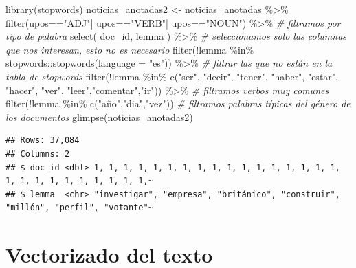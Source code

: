\documentclass[
]{book}
\newenvironment{Shaded}{\begin{snugshade}}{\end{snugshade}}
\newcommand{\AttributeTok}[1]{\textcolor[rgb]{0.77,0.63,0.00}{#1}}
\newcommand{\CommentTok}[1]{\textcolor[rgb]{0.56,0.35,0.01}{\textit{#1}}}
\newcommand{\FunctionTok}[1]{\textcolor[rgb]{0.00,0.00,0.00}{#1}}
\newcommand{\NormalTok}[1]{#1}
\newcommand{\OtherTok}[1]{\textcolor[rgb]{0.56,0.35,0.01}{#1}}
\newcommand{\SpecialCharTok}[1]{\textcolor[rgb]{0.00,0.00,0.00}{#1}}
\newcommand{\StringTok}[1]{\textcolor[rgb]{0.31,0.60,0.02}{#1}}
\begin{document}
\begin{Shaded}
\begin{Highlighting}[]
\FunctionTok{library}\NormalTok{(stopwords)}
\NormalTok{noticias\_anotadas2 }\OtherTok{\textless{}{-}}\NormalTok{ noticias\_anotadas }\SpecialCharTok{\%\textgreater{}\%} 
  \FunctionTok{filter}\NormalTok{(upos}\SpecialCharTok{==}\StringTok{"ADJ"}\SpecialCharTok{|}\NormalTok{ upos}\SpecialCharTok{==}\StringTok{"VERB"}\SpecialCharTok{|}\NormalTok{ upos}\SpecialCharTok{==}\StringTok{"NOUN"}\NormalTok{) }\SpecialCharTok{\%\textgreater{}\%} \CommentTok{\# filtramos por tipo de palabra}
  \FunctionTok{select}\NormalTok{( doc\_id, lemma ) }\SpecialCharTok{\%\textgreater{}\%} \CommentTok{\# seleccionamos solo las columnas que nos interesan, esto no es necesario}
  \FunctionTok{filter}\NormalTok{(}\SpecialCharTok{!}\NormalTok{lemma }\SpecialCharTok{\%in\%}\NormalTok{ stopwords}\SpecialCharTok{::}\FunctionTok{stopwords}\NormalTok{(}\AttributeTok{language =} \StringTok{"es"}\NormalTok{)) }\SpecialCharTok{\%\textgreater{}\%} \CommentTok{\# filtrar las que no están en la tabla de stopwords}
  \FunctionTok{filter}\NormalTok{(}\SpecialCharTok{!}\NormalTok{lemma }\SpecialCharTok{\%in\%} \FunctionTok{c}\NormalTok{(}\StringTok{"ser"}\NormalTok{, }\StringTok{"decir"}\NormalTok{, }\StringTok{"tener"}\NormalTok{, }\StringTok{"haber"}\NormalTok{, }\StringTok{"estar"}\NormalTok{, }\StringTok{"hacer"}\NormalTok{, }\StringTok{"ver"}\NormalTok{, }\StringTok{"leer"}\NormalTok{,}\StringTok{"comentar"}\NormalTok{,}\StringTok{"ir"}\NormalTok{)) }\SpecialCharTok{\%\textgreater{}\%} \CommentTok{\# filtramos verbos muy comunes}
  \FunctionTok{filter}\NormalTok{(}\SpecialCharTok{!}\NormalTok{lemma }\SpecialCharTok{\%in\%} \FunctionTok{c}\NormalTok{(}\StringTok{"año"}\NormalTok{,}\StringTok{"dia"}\NormalTok{,}\StringTok{"vez"}\NormalTok{)) }\CommentTok{\# filtramos palabras típicas del género de los documentos}
\FunctionTok{glimpse}\NormalTok{(noticias\_anotadas2)}
\end{Highlighting}
\end{Shaded}

\begin{verbatim}
## Rows: 37,084
## Columns: 2
## $ doc_id <dbl> 1, 1, 1, 1, 1, 1, 1, 1, 1, 1, 1, 1, 1, 1, 1, 1, 1, 1, 1, 1, 1, 1, 1, 1, 1, 1, 1,~
## $ lemma  <chr> "investigar", "empresa", "británico", "construir", "millón", "perfil", "votante"~
\end{verbatim}

\hypertarget{vectorizado-del-texto}{%
\section{Vectorizado del texto}\label{vectorizado-del-texto}}
\end{document}
